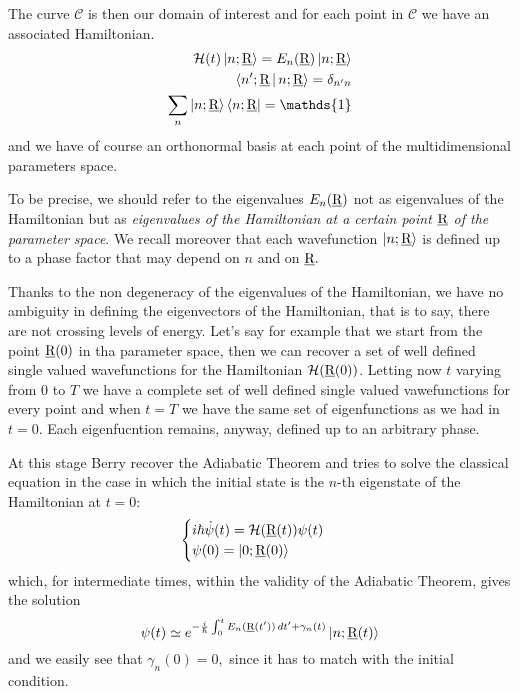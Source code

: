 The curve $ \mathcal{C} $ is then our domain of interest and for each point in $ \mathcal{C} $ we have an associated Hamiltonian.
\begin{align}
\Ham(t)\Ket{n;\rp}=E_n(\rp)\Ket{n;\rp}\\
\Braket{n';\rp|n;\rp}=\delta_{n'n}\\
\sum_{n}\Ket{n;\rp}\Bra{n;\rp}=\mathds{1}
\end{align}
and we have of course an orthonormal basis at each point of the multidimensional parameters space.
\begin{rem}
	To be precise, we should refer to the eigenvalues $ E_{n}(\underline{\textrm{R}}) $ not as eigenvalues of the Hamiltonian but as \emph{eigenvalues of the Hamiltonian at a certain point $ \underline{\textrm{R}} $ of the parameter space}. We recall moreover that each wavefunction $ \Ket{n;\underline{\textrm{R}}} $ is defined up to a phase factor that may depend on $ n $ and on $ \underline{\textrm{R}}. $ 
\end{rem}
\begin{rem}
	Thanks to the non degeneracy of the eigenvalues of the Hamiltonian, we have no ambiguity in defining the eigenvectors of the Hamiltonian, that is to say, there are not crossing levels of energy. Let's say for example that we start from the point $ \underline{\textrm{R}}(0) $ in tha parameter space, then we can recover a set of well defined single valued wavefunctions for the Hamiltonian $ \mathcal{H}(\underline{\textrm{R}}(0)) $. Letting now $ t $ varying from $ 0 $ to $ T $ we have a complete set of well defined single valued vawefunctions for every point and when $ t=T $ we have the same set of eigenfunctions as we had in $ t=0. $ Each eigenfucntion remains, anyway, defined up to an arbitrary phase. 
\end{rem}

At this stage Berry recover the Adiabatic Theorem and tries to solve the classical \Sch equation in the case in which the initial state is the $ n $-th eigenstate of the Hamiltonian at $ t=0 $:
\begin{equation}
\begin{cases}
i\hbar\dot{\psi}(t)=\mathcal{H}(\underline{\textrm{R}}(t))\psi(t)\\
\psi(0)=\Ket{0;\underline{\textrm{R}}(0)}
\end{cases}
\end{equation}
which, for intermediate times, within the validity of the Adiabatic Theorem, gives the solution
\begin{equation}
\psi(t)\simeq e^{-\frac{i}{\hbar}\int_{0}^{t}E_n(\underline{\textrm{R}}(t'))\mathop{}\!d t'+\gamma_n(t)}\Ket{n;\underline{\textrm{R}}(t)}
\label{eq:gen_solution}
\end{equation}
and we easily see that $ \gamma_n(0)=0, $ since it has to match with the initial condition.

